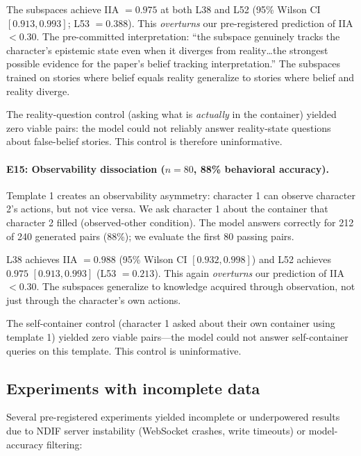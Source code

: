 \documentclass[11pt]{article}
\begin{document}
The subspaces achieve IIA $= 0.975$ at both L38 and L52 (95\% Wilson CI $[0.913, 0.993]$; L53 $= 0.388$). This \emph{overturns} our pre-registered prediction of IIA $< 0.30$. The pre-committed interpretation: ``the subspace genuinely tracks the character's epistemic state even when it diverges from reality\ldots the strongest possible evidence for the paper's belief tracking interpretation.'' The subspaces trained on stories where belief equals reality generalize to stories where belief and reality diverge.

The reality-question control (asking what is \emph{actually} in the container) yielded zero viable pairs: the model could not reliably answer reality-state questions about false-belief stories. This control is therefore uninformative.

\paragraph{E15: Observability dissociation ($n = 80$, 88\% behavioral accuracy).}
Template 1 creates an observability asymmetry: character 1 can observe character 2's actions, but not vice versa. We ask character 1 about the container that character 2 filled (observed-other condition). The model answers correctly for 212 of 240 generated pairs (88\%); we evaluate the first 80 passing pairs.

L38 achieves IIA $= 0.988$ (95\% Wilson CI $[0.932, 0.998]$) and L52 achieves $0.975$ $[0.913, 0.993]$ (L53 $= 0.213$). This again \emph{overturns} our prediction of IIA $< 0.30$. The subspaces generalize to knowledge acquired through observation, not just through the character's own actions.

The self-container control (character 1 asked about their own container using template 1) yielded zero viable pairs---the model could not answer self-container queries on this template. This control is uninformative.

\subsection{Experiments with incomplete data}

Several pre-registered experiments yielded incomplete or underpowered results due to NDIF server instability (WebSocket crashes, write timeouts) or model-accuracy filtering:
\end{document}
